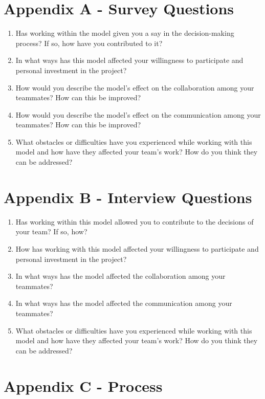 \chapter*{Appendix A - Survey Questions}

\begin{enumerate}
    \item Has working within the model given you a say in the decision-making process? If so, how have you contributed to it?
    \item In what ways has this model affected your willingness to participate and personal investment in the project? 
    \item How would you describe the model's effect on the collaboration among your teammates? How can this be improved?
    \item How would you describe the model's effect on the communication among your teammates? How can this be improved?
    \item What obstacles or difficulties have you experienced while working with this model and how have they affected your team's work? How do you think they can be addressed?
\end{enumerate}

\chapter*{Appendix B - Interview Questions}

\begin{enumerate}
    \item Has working within this model allowed you to contribute to the decisions of your team? If so, how?
    \item How has working with this model affected your willingness to participate and personal investment in the project?
    \item In what ways has the model affected the collaboration among your teammates?
    \item In what ways has the model affected the communication among your teammates?
    \item What obstacles or difficulties have you experienced while working with this model and how have they affected your team's work? How do you think they can be addressed?
\end{enumerate}

\chapter*{Appendix C - Process}

